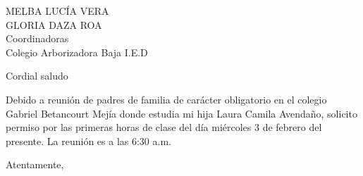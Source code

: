 \documentclass[letterpaper,spanish]{letter}
\date{1 de Febrero de 2016}
\begin{document}
\begin{letter}{MELBA LUCÍA VERA\\GLORIA DAZA ROA\\Coordinadoras\\Colegio Arborizadora Baja I.E.D}
	
\opening{Cordial saludo}
Debido a reunión de padres de familia de carácter obligatorio en el colegio Gabriel Betancourt Mejía donde estudia mi hija Laura Camila Avendaño, solicito permiso por las primeras horas de clase del día miércoles 3 de febrero del presente. La reunión es a las 6:30 a.m.
\closing{Atentamente,}


\end{letter}
\end{document}
